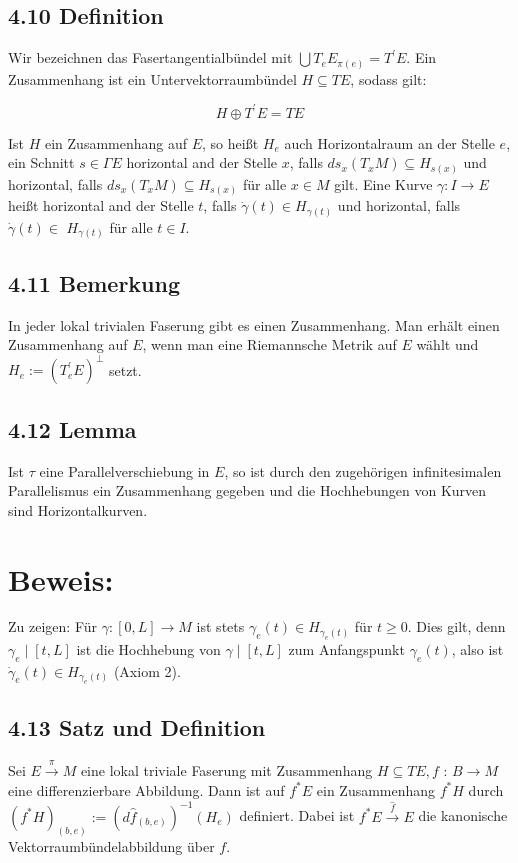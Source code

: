 \documentclass[10pt, letterpaper]{article}
\begin{document}
\subsection*{4.10 Definition}
Wir bezeichnen das Fasertangentialbündel mit $\bigcup T_{e} E_{\pi(e)}=T^{\prime} E$. Ein Zusammenhang ist ein Untervektorraumbündel $H \subseteq T E$, sodass gilt:

$$
H \oplus T^{\prime} E=T E
$$

Ist $H$ ein Zusammenhang auf $E$, so heißt $H_{e}$ auch Horizontalraum an der Stelle $e$, ein Schnitt $s \in \Gamma E$ horizontal and der Stelle $x$, falls $d s_{x}\left(T_{x} M\right) \subseteq H_{s(x)}$ und horizontal, falls $d s_{x}\left(T_{x} M\right) \subseteq H_{s(x)}$ für alle $x \in M$ gilt. Eine Kurve $\gamma: I \rightarrow E$ heißt horizontal and der Stelle $t$, falls $\dot{\gamma}(t) \in H_{\gamma(t)}$ und horizontal, falls $\dot{\gamma}(t) \in$ $H_{\gamma(t)}$ für alle $t \in I$.

\subsection*{4.11 Bemerkung}
In jeder lokal trivialen Faserung gibt es einen Zusammenhang. Man erhält einen Zusammenhang auf $E$, wenn man eine Riemannsche Metrik auf $E$ wählt und $H_{e}:=\left(T_{e}^{\prime} E\right)^{\perp}$ setzt.

\subsection*{4.12 Lemma}
Ist $\tau$ eine Parallelverschiebung in $E$, so ist durch den zugehörigen infinitesimalen Parallelismus ein Zusammenhang gegeben und die Hochhebungen von Kurven sind Horizontalkurven.

\section*{Beweis:}
Zu zeigen: Für $\gamma:[0, L] \rightarrow M$ ist stets $\gamma_{e}(t) \in H_{\gamma_{e}(t)}$ für $t \geq 0$. Dies gilt, denn $\gamma_{e} \mid[t, L]$ ist die Hochhebung von $\gamma \mid[t, L]$ zum Anfangspunkt $\gamma_{e}(t)$, also ist $\dot{\gamma}_{e}(t) \in H_{\gamma_{e}(t)}$ (Axiom 2).

\subsection*{4.13 Satz und Definition}
Sei $E \xrightarrow{\pi} M$ eine lokal triviale Faserung mit Zusammenhang $H \subseteq T E, f$ : $B \rightarrow M$ eine differenzierbare Abbildung. Dann ist auf $f^{*} E$ ein Zusammenhang $f^{*} H$ durch $\left(f^{*} H\right)_{(b, e)}:=\left(d \hat{f}_{(b, e)}\right)^{-1}\left(H_{e}\right)$ definiert. Dabei ist $f^{*} E \xrightarrow{\hat{f}} E$ die kanonische Vektorraumbündelabbildung über $f$.
\end{document}
